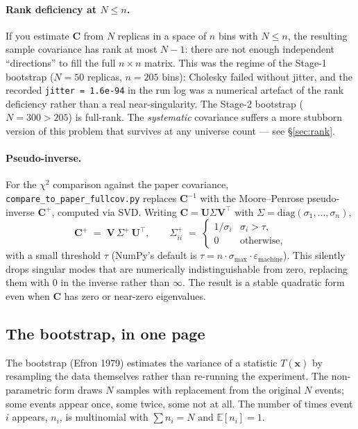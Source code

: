 \documentclass[12pt]{article}
\newcommand{\T}{^{\!\top}}
\newcommand{\diag}{\mathrm{diag}}
\begin{document}
\paragraph{Rank deficiency at $N \le n$.}
If you estimate $\mathbf{C}$ from $N$ replicas in a space of $n$ bins
with $N\le n$, the resulting sample covariance has rank at most
$N-1$: there are not enough independent ``directions'' to fill the
full $n\times n$ matrix. This was the regime of the Stage-1 bootstrap
($N=50$ replicas, $n=205$ bins): Cholesky failed without jitter, and
the recorded \texttt{jitter = 1.6e-94} in the run log was a numerical
artefact of the rank deficiency rather than a real near-singularity.
The Stage-2 bootstrap ($N=300 > 205$) is full-rank. The
\emph{systematic} covariance suffers a more stubborn version of this
problem that survives at any universe count --- see \S\ref{sec:rank}.

\paragraph{Pseudo-inverse.}
For the $\chi^{2}$ comparison against the paper covariance,
\texttt{compare\_to\_paper\_fullcov.py} replaces $\mathbf{C}^{-1}$
with the Moore--Penrose pseudo-inverse $\mathbf{C}^{+}$, computed
via SVD. Writing $\mathbf{C}=\mathbf{U}\Sigma\mathbf{V}\T$ with
$\Sigma=\diag(\sigma_{1},\dots,\sigma_{n})$,
\begin{equation}
\mathbf{C}^{+} \;=\; \mathbf{V}\,\Sigma^{+}\,\mathbf{U}\T,
\qquad
\Sigma^{+}_{ii} \;=\;
\begin{cases}
1/\sigma_{i} & \sigma_{i} > \tau,\\
0 & \text{otherwise},
\end{cases}
\end{equation}
with a small threshold $\tau$ (NumPy's default is
$\tau = n \cdot \sigma_{\max} \cdot \varepsilon_{\text{machine}}$).
This silently drops singular modes that are numerically
indistinguishable from zero, replacing them with $0$ in the inverse
rather than $\infty$. The result is a stable quadratic form even when
$\mathbf{C}$ has zero or near-zero eigenvalues.

\subsection{The bootstrap, in one page}
\label{sec:bootstrap-prereq}

The bootstrap (Efron 1979) estimates the variance of a statistic
$T(\mathbf{x})$ by resampling the data themselves rather than
re-running the experiment. The non-parametric form draws $N$ samples
with replacement from the original $N$ events; some events appear
once, some twice, some not at all. The number of times event $i$
appears, $n_{i}$, is multinomial with $\sum n_{i}=N$ and
$\mathbb{E}[n_{i}]=1$.
\end{document}
